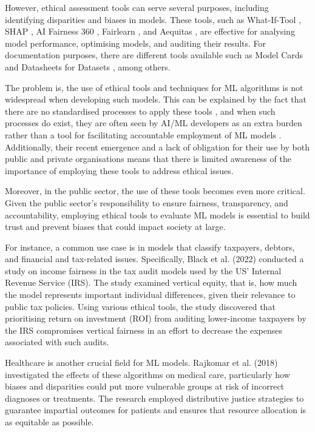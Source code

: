 \documentclass[fleqn,10pt]{wlscirep}
\begin{document}
However, ethical assessment tools can serve several purposes, including identifying disparities and biases in models. These tools, such as What-If-Tool \cite{wexler_2018}, SHAP \cite{NIPS2017_7062}, AI Fairness 360 \cite{aif360-oct-2018}, Fairlearn \cite{weerts2023fairlearn}, and Aequitas \cite{DBLP:journals/corr/abs-1811-05577}, are effective for analysing model performance, optimising models, and auditing their results. For documentation purposes, there are different tools available such as Model Cards \cite{DBLP:journals/corr/abs-1810-03993} and Datasheets for Datasets \cite{DBLP:journals/corr/abs-1803-09010}, among others. 

The problem is, the use of ethical tools and techniques for ML algorithms is not widespread when developing such models. This can be explained by the fact that there are no standardised processes to apply these tools \cite{agarwal2022sevenlayermodelstandardisingai}, and when such processes do exist, they are often seen by AI/ML developers as an extra burden rather than a tool for facilitating accountable employment of ML models \cite{https://doi.org/10.48550/arxiv.2206.02923,ijcai2023p735}. Additionally, their recent emergence and a lack of obligation for their use by both public and private organisations means that there is limited awareness of the importance of employing these tools to address ethical issues.

Moreover, in the public sector, the use of these tools becomes even more critical. Given the public sector’s responsibility to ensure fairness, transparency, and accountability, employing ethical tools to evaluate ML models is essential to build trust and prevent biases that could impact society at large.

For instance, a common use case is in models that classify taxpayers, debtors, and financial and tax-related issues. Specifically, Black et al. (2022) \cite{10.1145/3531146.3533204} conducted a study on income fairness in the tax audit models used by the US' Internal Revenue Service (IRS). The study examined vertical equity, that is, how much the model represents important individual differences, given their relevance to public tax policies. Using various ethical tools, the study discovered that prioritising return on investment (ROI) from auditing lower-income taxpayers by the IRS compromises vertical fairness in an effort to decrease the expenses associated with such audits.

Healthcare is another crucial field for ML models. Rajkomar et al. (2018)\cite{Rajkomar2018} investigated the effects of these algorithms on medical care, particularly how biases and disparities could put more vulnerable groups at risk of incorrect diagnoses or treatments. The research employed distributive justice strategies to guarantee impartial outcomes for patients and ensures that resource allocation is as equitable as possible.
\end{document}
